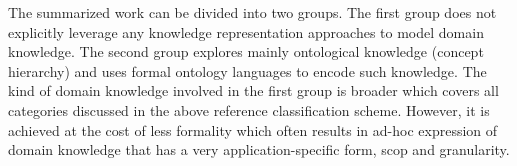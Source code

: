 The summarized work can be divided into two groups. The first group does not explicitly leverage any knowledge representation approaches to model domain knowledge. The second group explores mainly ontological knowledge (concept hierarchy) and uses formal ontology languages to encode such knowledge. The kind of domain knowledge involved in the first group is broader which covers all categories discussed in the above reference classification scheme. However, it is achieved at the cost of less formality which often results in ad-hoc expression of domain knowledge that has a very application-specific form, scop and granularity.




